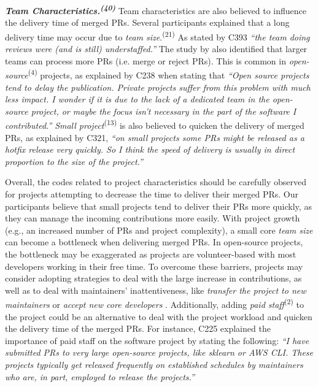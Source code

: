 \vspace{0.6mm}
\noindent\textit{\textbf{Team Characteristics.\textsuperscript{(40)}}} Team characteristics are also believed to influence the delivery time of merged PRs. Several participants explained that a long delivery time may occur due to 
 \textit{team size}.\textsuperscript{(21)} As stated by C393 \textit{``the team doing reviews were (and is still) understaffed.''} 
The study by \cite{Vasilescu2015-tn} also identified that larger teams can process more PRs (i.e. merge or reject PRs).
This is common in \textit{open-source}\textsuperscript{(4)} projects, as explained by C238 when stating that \textit{``Open source projects tend to delay the publication. Private projects suffer from this problem with much less impact. I wonder if it is due to the lack of a dedicated team in the open-source project, or maybe the focus isn't necessary in the part of the software I contributed.''} \textit{Small project}\textsuperscript{(13)} is also believed to quicken the delivery of merged PRs, as explained by C321, \textit{``on small projects some PRs might be released as a hotfix release very quickly. So I think the speed of delivery is usually in direct proportion to the size of the project.''} 

Overall, the codes related to project characteristics should be carefully observed for projects attempting to decrease the time to deliver their merged PRs. Our participants believe that small projects tend to deliver their PRs more quickly, as they can manage the incoming contributions more easily. With project growth (e.g., an increased number of PRs and project complexity), a small core \textit{team size} can become a bottleneck when delivering merged PRs. In open-source projects, the bottleneck may be exaggerated as projects are volunteer-based \citep{alexander2002working} with most developers working in their free time. To overcome these barriers, projects may consider adopting strategies to deal with the large increase in contributions, as well as to deal with maintainers' inattentiveness, like \textit{transfer the project to new maintainers} or \textit{accept new core developers} \citep{coelho2017modern}. Additionally, adding \textit{paid staff}\textsuperscript{(2)} to the project could be an alternative to deal with the project workload and quicken the delivery time of the merged PRs. For instance, C225 explained the importance of paid staff on the software project by stating the following: \textit{``I have submitted PRs to very large open-source projects, like sklearn or AWS CLI. These projects typically get released frequently on established schedules by maintainers who are, in part, employed to release the projects.''}

